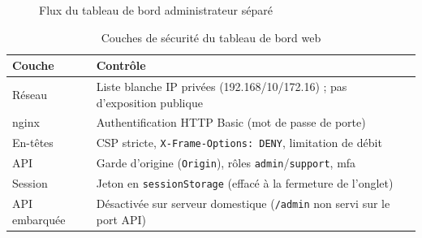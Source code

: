 \begin{figure}[H]
  \centering
  \caption{Flux du tableau de bord administrateur séparé}
  \label{fig:flux-admin}
\end{figure}

\begin{table}[H]
  \centering
  \caption{Couches de sécurité du tableau de bord web}
  \label{tab:admin-security}
  \begin{tabularx}{\textwidth}{@{}lX@{}}
    \toprule
    \textbf{Couche} & \textbf{Contrôle} \\
    \midrule
    Réseau & Liste blanche IP privées (192.168/10/172.16) ; pas d'exposition publique \\
    nginx & Authentification HTTP Basic (mot de passe de porte) \\
    En-têtes & CSP stricte, \texttt{X-Frame-Options: DENY}, limitation de débit \\
    API & Garde d'origine (\texttt{Origin}), rôles \texttt{admin}/\texttt{support}, \gls{mfa} \\
    Session & Jeton en \texttt{sessionStorage} (effacé à la fermeture de l'onglet) \\
    API embarquée & Désactivée sur serveur domestique (\texttt{/admin} non servi sur le port API) \\
    \bottomrule
  \end{tabularx}
\end{table}

